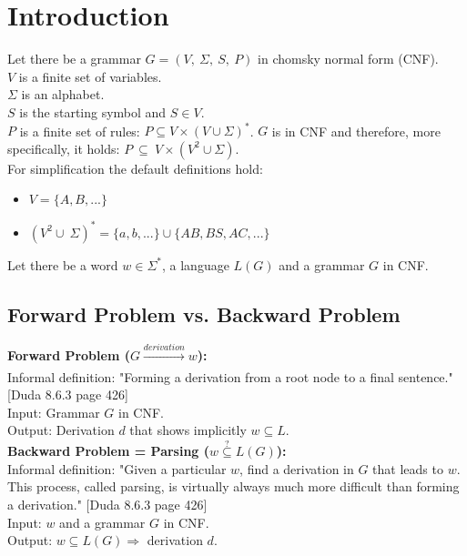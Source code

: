 
\section{Introduction}\label{Introduction}

\noindent Let there be a grammar $G=(V,\ \Sigma,\ S,\ P)$ in chomsky normal form (CNF).\\
$V$ is a finite set of variables. \\
$\Sigma$ is an alphabet. \\
$S$ is the starting symbol and $S \in V$. \\
$P$ is a finite set of rules: $P \subseteq V \times (V \cup \Sigma)^{*}$. $G$ is in CNF and therefore, more specifically, it holds:  $P\ \subseteq\ V \times (V^{2} \cup \Sigma)$.\\
 
\noindent For simplification the default definitions hold:
\begin{itemize}
	\item $V = \{A, B, ...\}$
	\item $(V^2 \cup\ \Sigma)^{*}=\{a, b, ...\} \cup \{AB, BS, AC, ... \}$
\end{itemize}

\noindent Let there be a word $w \in \Sigma^*$, a language $L(G)$ and a grammar $G$ in CNF. 

\subsection{Forward Problem vs. Backward Problem}

\noindent\textbf{Forward Problem ($G \xrightarrow[]{derivation} w$):}\\
Informal definition: "Forming a derivation from a root node to a final sentence."  [Duda 8.6.3 page 426]\\
Input: Grammar $G$ in CNF.\\
Output: Derivation $d$ that shows implicitly $w \subseteq L$.\\

\noindent\textbf{Backward Problem = Parsing ($w\overset{?}{\subseteq}L(G)$):}\\
Informal definition: "Given a particular $w$, find a derivation in $G$ that leads to $w$. This process, called parsing, is virtually always much more difficult than forming a derivation."  [Duda 8.6.3 page 426]\\
Input: $w$ and a grammar $G$ in CNF.\\
Output: $w \subseteq L(G) \Longrightarrow$ derivation $d$.\\

